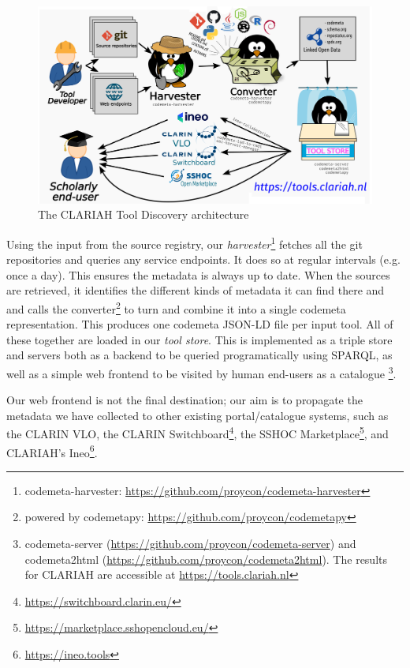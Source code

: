 \documentclass[a4paper,11pt]{article}
\begin{document}
\begin{figure}[h]
\begin{center}
\includegraphics[width=14.0cm]{architecture.png}
\caption{The CLARIAH Tool Discovery architecture}
\end{center}
\label{fig:architecture}
\end{figure}

Using the input from the source registry, our
\emph{harvester}\footnote{codemeta-harvester:
\url{https://github.com/proycon/codemeta-harvester}} fetches all the git
repositories and queries any service endpoints. It does so at regular intervals
(e.g. once a day). This ensures the metadata is always up to date. When the
sources are retrieved, it identifies the different kinds of metadata it can
find there and and calls the converter\footnote{powered by codemetapy:
\url{https://github.com/proycon/codemetapy}} to turn and combine it into a
single codemeta representation. This produces one codemeta JSON-LD file per
input tool. All of these together are loaded in our \emph{tool store}. This is
implemented as a triple store and servers both as a backend to be queried
programatically using SPARQL, as well as a simple web frontend to be visited by
human end-users as a catalogue \footnote{codemeta-server
(\url{https://github.com/proycon/codemeta-server}) and codemeta2html
(\url{https://github.com/proycon/codemeta2html}). The results for CLARIAH are
accessible at \url{https://tools.clariah.nl}}.

Our web frontend is not the final destination; our aim is to propagate the
metadata we have collected to other existing portal/catalogue systems, such as
the CLARIN VLO, the CLARIN
Switchboard\footnote{\url{https://switchboard.clarin.eu/}}, the SSHOC
Marketplace\footnote{\url{https://marketplace.sshopencloud.eu/}}, and CLARIAH's
Ineo\footnote{\url{https://ineo.tools}}.
\end{document}
